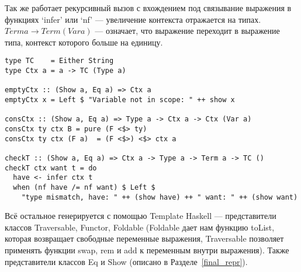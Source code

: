 Так же работает рекурсивный вызов с вхождением под связывание выражения в функциях `infer' или `nf' --- увеличение контекста отражается на типах. $Term a \rightarrow Term (Var a)$ --- означает, что выражение переходит в выражение типа, контекст которого больше на единицу.

\begin{lstlisting}[caption={Проверка типов и контексты},captionpos=b, frame=single, float,floatplacement=H, label={lst_checkT}]
type TC    = Either String
type Ctx a = a -> TC (Type a)

emptyCtx :: (Show a, Eq a) => Ctx a
emptyCtx x = Left $ "Variable not in scope: " ++ show x

consCtx :: (Show a, Eq a) => Type a -> Ctx a -> Ctx (Var a)
consCtx ty ctx B = pure (F <$> ty)
consCtx ty ctx (F a)  = (F <$>) <$> ctx a

checkT :: (Show a, Eq a) => Ctx a -> Type a -> Term a -> TC ()
checkT ctx want t = do
  have <- infer ctx t
  when (nf have /= nf want) $ Left $
    "type mismatch, have: " ++ (show have) ++ " want: " ++ (show want)
\end{lstlisting}

Всё остальное генерируется с помощью Template Haskell\cite{TH} --- представители классов Traversable\cite{deriveFun}, Functor, Foldable (Foldable дает нам функцию toList, которая возвращает свободные переменные выражения, Traversable позволяет применять функции swap, rem и add к переменным внутри выражения). Также представители классов Eq и Show (описано в Разделе~\ref{final_repr}).


